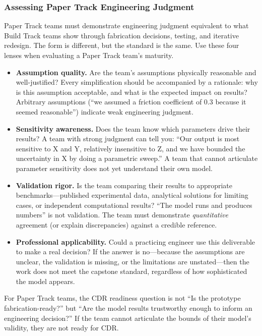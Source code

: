 \subsubsection{Assessing Paper Track Engineering Judgment}

Paper Track teams must demonstrate engineering judgment equivalent to what Build Track teams show through fabrication decisions, testing, and iterative redesign. The form is different, but the standard is the same. Use these four lenses when evaluating a Paper Track team's maturity.

\begin{itemize}[nosep,leftmargin=1.5em]
\item \textbf{Assumption quality.} Are the team's assumptions physically reasonable and well-justified? Every simplification should be accompanied by a rationale: why is this assumption acceptable, and what is the expected impact on results? Arbitrary assumptions (``we assumed a friction coefficient of 0.3 because it seemed reasonable'') indicate weak engineering judgment.

\item \textbf{Sensitivity awareness.} Does the team know which parameters drive their results? A team with strong judgment can tell you: ``Our output is most sensitive to X and Y, relatively insensitive to Z, and we have bounded the uncertainty in X by doing a parametric sweep.'' A team that cannot articulate parameter sensitivity does not yet understand their own model.

\item \textbf{Validation rigor.} Is the team comparing their results to appropriate benchmarks---published experimental data, analytical solutions for limiting cases, or independent computational results? ``The model runs and produces numbers'' is not validation. The team must demonstrate \emph{quantitative} agreement (or explain discrepancies) against a credible reference.

\item \textbf{Professional applicability.} Could a practicing engineer use this deliverable to make a real decision? If the answer is no---because the assumptions are unclear, the validation is missing, or the limitations are unstated---then the work does not meet the capstone standard, regardless of how sophisticated the model appears.
\end{itemize}

\begin{bestpractice}
For Paper Track teams, the CDR readiness question is not ``Is the prototype fabrication-ready?'' but ``Are the model results trustworthy enough to inform an engineering decision?'' If the team cannot articulate the bounds of their model's validity, they are not ready for CDR.
\end{bestpractice}

